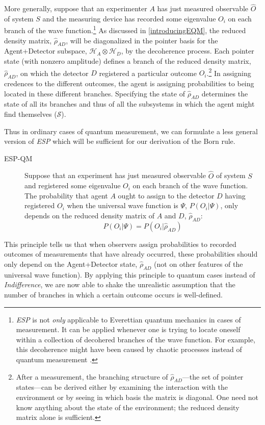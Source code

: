 \documentclass[onecolumn,secnumarabic,amsmath,amssymb,balancelastpage,nofootinbib]{article}
\begin{document}
More generally, suppose that an experimenter $A$ has just measured observable $\widehat{O}$ of system $S$ and the measuring device has recorded some eigenvalue $O_i$ on each branch of the wave function.\footnote{\emph{ESP} is not \emph{only} applicable to Everettian quantum mechanics in cases of measurement.  It can be applied whenever one is trying to locate oneself within a collection of decohered branches of the wave function.  For example, this decoherence might have been caused by chaotic processes instead of quantum measurement \citep[ch. 3]{wallace2012}.}  As discussed in \textsection \ref{introducingEQM}, the reduced density matrix, $\widehat{\rho}_{AD}$, will be diagonalized in the pointer basis for the Agent+Detector subspace, $\mathscr{H}_A\otimes \mathscr{H}_D$, by the decoherence process.  Each pointer state (with nonzero amplitude) defines a branch of the reduced density matrix, $\widehat{\rho}_{AD}$, on which the detector $D$ registered a particular outcome $O_i$.\footnote{After a measurement, the branching structure of $\widehat{\rho}_{AD}$---the set of pointer states---can be derived either by examining the interaction with the environment or by seeing in which basis the matrix is diagonal.  One need not know anything about the state of the environment; the reduced density matrix alone is sufficient.}  In assigning credences to the different outcomes, the agent is assigning probabilities to being located in these different branches.  Specifying the state of $\widehat{\rho}_{AD}$ determines the state of all its branches and thus of all the subsystems in which the agent might find themselves ($\mathcal{S}$).

Thus in ordinary cases of quantum measurement, we can formulate a less general version of \emph{ESP} which will be sufficient for our derivation of the Born rule.
\begin{description}
\item[ESP-QM]  Suppose that an experiment has just measured observable $\widehat{O}$ of system $S$ and registered some eigenvalue $O_i$ on each branch of the wave function.  The probability that agent $A$ ought to assign to the detector $D$ having registered $O_i$ when the universal wave function is $\Psi$, $P(O_i|\Psi)$, only depends on the reduced density matrix of $A$ and $D$, $\widehat{\rho}_{AD}$:
\begin{equation}
P(O_i|\Psi)=P(O_i|\widehat{\rho}_{AD})
\end{equation}
\end{description}
This principle tells us that when observers assign probabilities to recorded outcomes of measurements that have already occurred, these probabilities should only depend on the Agent+Detector state, $\widehat{\rho}_{AD}$ (not on other features of the universal wave function).  By applying this principle to quantum cases instead of \emph{Indifference}, we are now able to shake the unrealistic assumption that the number of branches in which a certain outcome occurs is well-defined.
\end{document}
